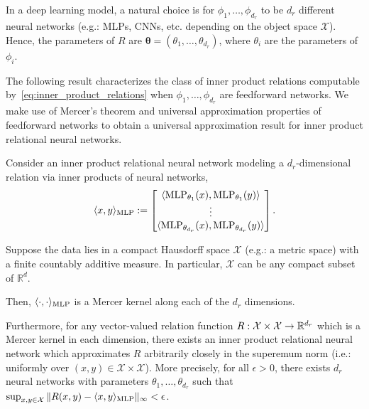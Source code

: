 In a deep learning model, a natural choice is for \(\phi_{1}, \ldots, \phi_{d_r}\) to be \(d_r\) different neural networks (e.g.: MLPs, CNNs, etc. depending on the object space \(\mathcal{X}\)). Hence, the parameters of \(R\) are \(\boldsymbol{\theta} = (\theta_{1}, \ldots, \theta_{d_r})\), where \(\theta_{i}\) are the parameters of \(\phi_{i}\).

The following result characterizes the class of inner product relations computable by~\eqref{eq:inner_product_relations} when \(\phi_{1}, \ldots, \phi_{d_r}\) are feedforward networks. We make use of Mercer's theorem and universal approximation properties of feedforward networks to obtain a universal approximation result for inner product relational neural networks.


\begin{thm}
	\label{theorem:function_class_inner_product_relnn}
	\hphantom{~}

	Consider an inner product relational neural network modeling a \(d_r\)-dimensional relation via inner products of neural networks,
	\begin{equation*}
		\langle x, y \rangle_{\text{MLP}} := \begin{bmatrix}\langle \text{MLP}_{\theta_1}(x), \text{MLP}_{\theta_1}(y) \rangle \\ \vdots \\ \langle \text{MLP}_{\theta_{d_r}}(x), \text{MLP}_{\theta_{d_r}}(y) \rangle\end{bmatrix}.
	\end{equation*}

	Suppose the data lies in a compact Hausdorff space \(\mathcal{X}\) (e.g.: a metric space) with a finite countably additive measure. In particular, \(\mathcal{X}\) can be any compact subset of \(\mathbb{R}^d\).

	Then, \(\langle \cdot, \cdot \rangle_{\text{MLP}}\) is a Mercer kernel along each of the \(d_r\) dimensions.

	Furthermore, for any vector-valued relation function \(R: \mathcal{X} \times \mathcal{X} \to \mathbb{R}^{d_r}\) which is a Mercer kernel in each dimension, there exists an inner product relational neural network which approximates \(R\) arbitrarily closely in the superemum norm (i.e.: uniformly over \((x,y) \in \mathcal{X}\times\mathcal{X}\)). More precisely, for all \(\epsilon > 0\), there exists \(d_r\) neural networks with parameters \(\theta_1, \ldots, \theta_{d_r}\) such that \(\sup_{x,y \in \mathcal{X}}{\lVert R(x,y) - \langle x, y \rangle_{\text{MLP}} \rVert_\infty} < \epsilon\).
\end{thm}

